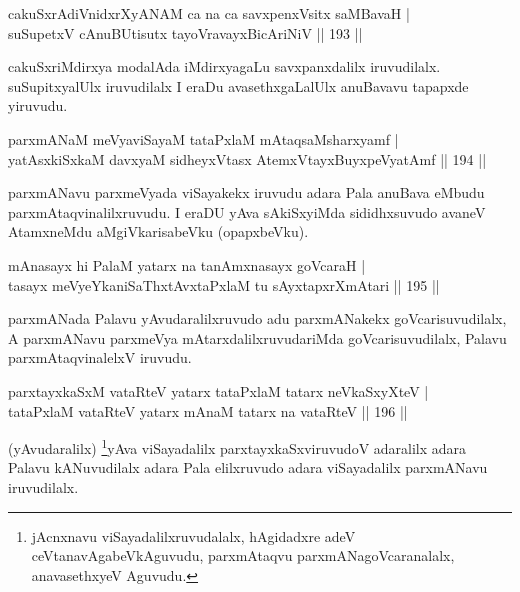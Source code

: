 \begin{shl}
cakuSxrAdiVnidxrXyANAM ca na ca savxpenxV\s sitx saMBavaH | \\
suSupetxV cAnuBUtisutx tayoVravayxBicAriNiV \hfill ||  193 ||  
\end{shl}

\begin{artha}
cakuSxriMdirxya modalAda iMdirxyagaLu savxpanxdalilx iruvudilalx. suSupitxyalUlx iruvudilalx I eraDu avasethxgaLalUlx anuBavavu tapapxde yiruvudu.
\end{artha}

\begin{shl}
parxmANaM meVyaviSayaM tataPxlaM mAtaqsaMsharxyamf | \\
yatAsxkiSxkaM davxyaM sidheyxVtasx AtemxVtayxBuyxpeVyatAmf \hfill ||  194 ||  
\end{shl}

\begin{artha}
parxmANavu parxmeVyada viSayakekx iruvudu adara Pala anuBava eMbudu parxmAtaqvinalilxruvudu. I eraDU yAva sAkiSxyiMda sididhxsuvudo avaneV AtamxneMdu aMgiVkarisabeVku (opapxbeVku).
\end{artha}

\begin{shl}
mAnasayx hi PalaM yatarx na tanAmxnasayx goVcaraH | \\
tasayx meVyeYkaniSaThxtAvxtaPxlaM tu sAyxtapxrXmAtari \hfill ||  195 ||  
\end{shl}

\begin{artha}
parxmANada Palavu yAvudaralilxruvudo adu parxmANakekx goVcarisuvudilalx, A parxmANavu parxmeVya mAtarxdalilxruvudariMda goVcarisuvudilalx, Palavu parxmAtaqvinalelxV iruvudu.
\end{artha}

\begin{shl}
parxtayxkaSxM vataRteV yatarx tataPxlaM tatarx neVkaSxyXteV | \\
tataPxlaM vataRteV yatarx mAnaM tatarx na vataRteV \hfill ||  196 ||  
\end{shl}

\begin{artha}
(yAvudaralilx) \footnote{jAcnxnavu viSayadalilxruvudalalx, hAgidadxre adeV ceVtanavAgabeVkAguvudu, parxmAtaqvu parxmANagoVcaranalalx, anavasethxyeV Aguvudu.}yAva viSayadalilx parxtayxkaSxviruvudoV adaralilx adara Palavu kANuvudilalx adara Pala elilxruvudo adara viSayadalilx parxmANavu iruvudilalx.
\end{artha}

